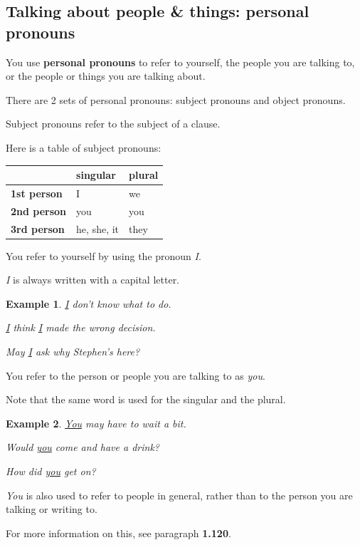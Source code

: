 \documentclass[oneside]{book}
\numberwithin{equation}{section}
\newtheorem{example}{Example}[section]
\begin{document}
\subsection{Talking about people \& things: personal pronouns}
\noindent{} You use \textbf{personal pronouns} to refer to yourself, the people you are talking to, or the people or things you are talking about.

%
There are 2 sets of personal pronouns: subject pronouns and object pronouns.

%
\noindent{} Subject pronouns refer to the subject of a clause.

%
Here is a table of subject pronouns:
\begin{table}[H]
    \centering
    \begin{tabular}{|l|l|l|}
        \hline
        & \textbf{singular} & \textbf{plural} \\
        \hline
        \textbf{1st person} & I & we \\
        \hline
        \textbf{2nd person} & you & you \\
        \hline
        \textbf{3rd person} & he, she, it & they \\
        \hline
    \end{tabular}
\end{table}
%
\noindent{} You refer to yourself by using the pronoun \textit{I}.

\textit{I} is always written with a capital letter.
\begin{example}
    \underline{I} don't know what to do.
    
    \underline{I} think \underline{I} made the wrong decision.
    
    May \underline{I} ask why Stephen's here?
\end{example}
%
\noindent{} You refer to the person or people you are talking to as \textit{you}.

Note that the same word is used for the singular and the plural.
\begin{example}
    \underline{You} may have to wait a bit.
    
    Would \underline{you} come and have a drink?
    
    How did \underline{you} get on?
\end{example}
\textit{You} is also used to refer to people in general, rather than to the person you are talking or writing to.

For more information on this, see paragraph \textbf{1.120}.
\end{document}
